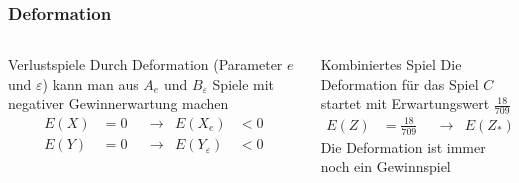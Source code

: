 %
%
%
\bgroup
\begin{frame}[t]
\setlength{\abovedisplayskip}{5pt}
\setlength{\belowdisplayskip}{5pt}
\frametitle{Deformation}
\vspace{-20pt}
\begin{columns}[t,onlytextwidth]
\begin{column}{0.48\textwidth}
\begin{block}{Verlustspiele}
Durch Deformation (Parameter $e$ und $\varepsilon$) kann man
aus $A_e$ und $B_\varepsilon$ Spiele mit negativer Gewinnerwartung machen
\begin{align*}
E(X)&=0&&\rightarrow&E(X_e)&<0\\
E(Y)&=0&&\rightarrow&E(Y_\varepsilon)&<0\\
\end{align*}
\end{block}
\end{column}
\begin{column}{0.48\textwidth}
\begin{block}{Kombiniertes Spiel}
Die Deformation für das Spiel $C$ startet mit Erwartungswert $\frac{18}{709}$
\begin{align*}
E(Z)&=\frac{18}{709}
&&\rightarrow&
E(Z_*)&>0
\end{align*}
Die Deformation ist immer noch ein Gewinnspiel
\end{block}
\end{column}
\end{columns}
\end{frame}
\egroup
